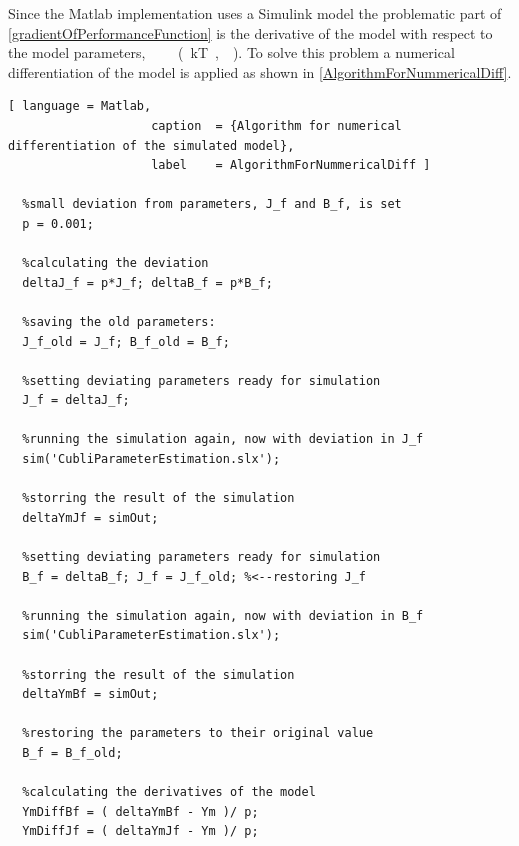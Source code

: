 Since the Matlab implementation uses a Simulink model the problematic part of \eqref{gradientOfPerformanceFunction} is the derivative of the model with respect to the model parameters, \si{\frac{\partial  }{\partial \vec{\theta}}\ (kT, \vec{\theta})}. To solve this problem a numerical differentiation of the model is applied as shown in \autoref{AlgorithmForNummericalDiff}.

\begin{lstlisting}[ language = Matlab,
                    caption  = {Algorithm for numerical differentiation of the simulated model},
                    label    = AlgorithmForNummericalDiff ]

  %small deviation from parameters, J_f and B_f, is set
  p = 0.001;
  
  %calculating the deviation
  deltaJ_f = p*J_f; deltaB_f = p*B_f;
  
  %saving the old parameters:
  J_f_old = J_f; B_f_old = B_f;
  
  %setting deviating parameters ready for simulation
  J_f = deltaJ_f;
  
  %running the simulation again, now with deviation in J_f
  sim('CubliParameterEstimation.slx');
  
  %storring the result of the simulation
  deltaYmJf = simOut;
  
  %setting deviating parameters ready for simulation
  B_f = deltaB_f; J_f = J_f_old; %<--restoring J_f
  
  %running the simulation again, now with deviation in B_f
  sim('CubliParameterEstimation.slx');
  
  %storring the result of the simulation
  deltaYmBf = simOut;
  
  %restoring the parameters to their original value
  B_f = B_f_old;
  
  %calculating the derivatives of the model
  YmDiffBf = ( deltaYmBf - Ym )/ p;
  YmDiffJf = ( deltaYmJf - Ym )/ p;
\end{lstlisting}

